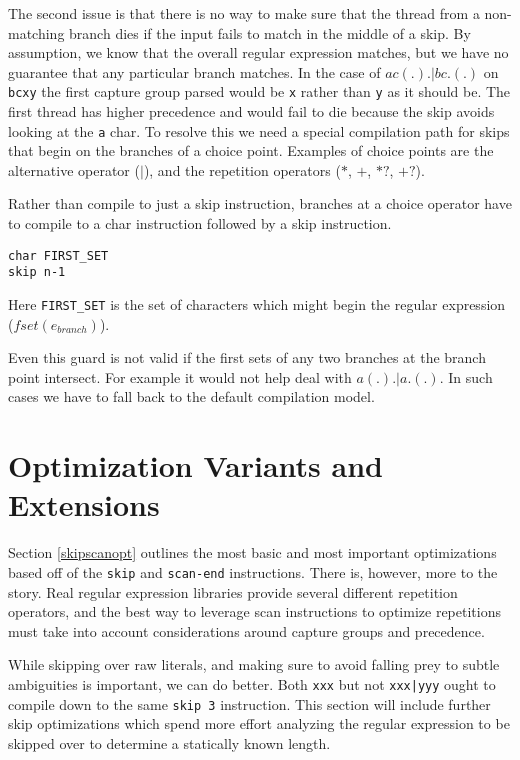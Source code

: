 The second issue is that there is no way to make sure that the
thread from a non-matching branch dies if the input fails to match in
the middle of a skip. By assumption, we know that the overall regular
expression matches, but we have no guarantee that any particular branch
matches. In the case of $ac(.). \rvert bc.(.)$ on \verb'bcxy' the
first capture group parsed would be \verb'x' rather than \verb'y' as
it should be. The first thread has higher precedence and would
fail to die because the skip avoids looking at the \verb'a' char.
To resolve this we need a special compilation path for skips
that begin on the branches of a choice point. Examples of
choice points are the alternative operator ($\rvert$),
and the repetition operators ($*$, $+$, $*?$, $+?$).

Rather than compile to just a skip instruction, branches
at a choice operator have to compile to a char instruction
followed by a skip instruction.

\begin{verbatim}
char FIRST_SET
skip n-1
\end{verbatim}

Here \verb'FIRST_SET' is the set of characters which might
begin the regular expression ($fset(e_{branch})$).

Even this guard is not valid if the first sets of any two
branches at the branch point intersect. For example it would
not help deal with $a(.).|a.(.)$. In such cases we have to fall
back to the default compilation model.

\section{Optimization Variants and Extensions}

Section \ref{skipscanopt} outlines the most basic and most
important optimizations based off of the \verb'skip' and \verb'scan-end'
instructions. There is, however, more to the story.
Real regular expression libraries provide several different repetition
operators, and the best way to leverage scan instructions to optimize
repetitions must take into account considerations around capture groups and
precedence.

While skipping over raw literals, and making sure to avoid
falling prey to subtle ambiguities is important, we can do better.
Both \verb'xxx' but not \verb'xxx|yyy' ought to compile down to
the same \verb'skip 3' instruction. This section will include 
further skip optimizations which spend more effort analyzing 
the regular expression to be skipped over to determine a
statically known length.

